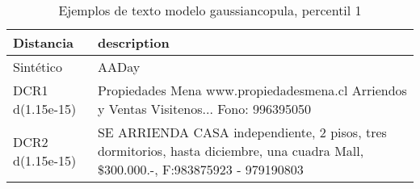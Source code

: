 \begin{table}[H]
\centering
\fontsize{10}{14}\selectfont
\caption{Ejemplos de texto modelo gaussiancopula, percentil 1}
\label{table-example-economicos-b-1-gaussiancopula-1p-text}
\begin{tabular}{|l|m{35em}|}
\hline
\rowcolor[gray]{0.8}
Distancia & description \\
\hline Sintético & AADay \\
\hline DCR1 d(1.15e-15) & Propiedades Mena www.propiedadesmena.cl Arriendos y Ventas Visitenos... Fono: 996395050 \\
\hline DCR2 d(1.15e-15) & SE ARRIENDA CASA independiente, 2 pisos, tres dormitorios, hasta diciembre, una cuadra Mall, \$300.000.-, F:983875923 - 979190803 \\
\hline
\end{tabular}
\end{table}
